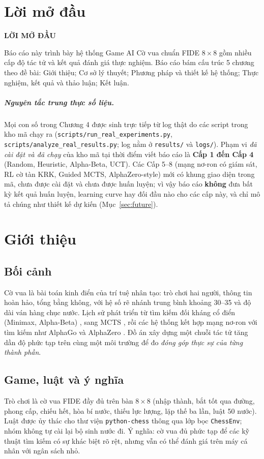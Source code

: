 \documentclass[13pt,a4paper]{extreport}
\newcommand{\chuong}[1]{\chapter*{#1}\addcontentsline{toc}{chapter}{#1}\markboth{}{}}
\newcommand{\tieude}[1]{\begin{center}\bfseries\Large\MakeUppercase{#1}\end{center}\vspace{0.6cm}}
\newcommand{\code}[1]{\texttt{#1}}
\begin{document}
\chuong{Lời mở đầu}
\tieude{Lời mở đầu}
Báo cáo này trình bày hệ thống Game AI Cờ vua chuẩn FIDE $8\times 8$ gồm nhiều cấp độ tác tử và kết quả đánh giá thực nghiệm. Báo cáo bám cấu trúc 5 chương theo đề bài: Giới thiệu; Cơ sở lý thuyết; Phương pháp và thiết kế hệ thống; Thực nghiệm, kết quả và thảo luận; Kết luận.

\paragraph{Nguyên tắc trung thực số liệu.} Mọi con số trong Chương 4 được sinh trực tiếp từ log thật do các script trong kho mã chạy ra (\code{scripts/run\_real\_experiments.py}, \code{scripts/analyze\_real\_results.py}; log nằm ở \code{results/} và \code{logs/}). Phạm vi \emph{đã cài đặt và đã chạy} của kho mã tại thời điểm viết báo cáo là \textbf{Cấp 1 đến Cấp 4} (Random, Heuristic, Alpha-Beta, UCT). Các Cấp 5--8 (mạng nơ-ron có giám sát, RL cờ tàn KRK, Guided MCTS, AlphaZero-style) mới có khung giao diện trong mã, chưa được cài đặt và chưa được huấn luyện; vì vậy báo cáo \textbf{không} đưa bất kỳ kết quả huấn luyện, learning curve hay đối đầu nào cho các cấp này, và chỉ mô tả chúng như thiết kế dự kiến (Mục~\ref{sec:future}).

\chapter{Giới thiệu}
\section{Bối cảnh}
Cờ vua là bài toán kinh điển của trí tuệ nhân tạo: trò chơi hai người, thông tin hoàn hảo, tổng bằng không, với hệ số rẽ nhánh trung bình khoảng 30--35 và độ dài ván hàng chục nước. Lịch sử phát triển từ tìm kiếm đối kháng cổ điển (Minimax, Alpha-Beta) \cite{knuth1975}, sang MCTS \cite{kocsis2006}, rồi các hệ thống kết hợp mạng nơ-ron với tìm kiếm như AlphaGo \cite{silver2016} và AlphaZero \cite{silver2017}. Đồ án xây dựng một chuỗi tác tử tăng dần độ phức tạp trên cùng một môi trường để đo \emph{đóng góp thực sự của từng thành phần}.

\section{Game, luật và ý nghĩa}
Trò chơi là cờ vua FIDE đầy đủ trên bàn $8\times 8$ (nhập thành, bắt tốt qua đường, phong cấp, chiếu hết, hòa bí nước, thiếu lực lượng, lặp thế ba lần, luật 50 nước). Luật được ủy thác cho thư viện \code{python-chess} thông qua lớp bọc \code{ChessEnv}; nhóm không tự cài lại bộ sinh nước đi. Ý nghĩa: cờ vua đủ phức tạp để các kỹ thuật tìm kiếm có sự khác biệt rõ rệt, nhưng vẫn có thể đánh giá trên máy cá nhân với ngân sách nhỏ.
\end{document}
